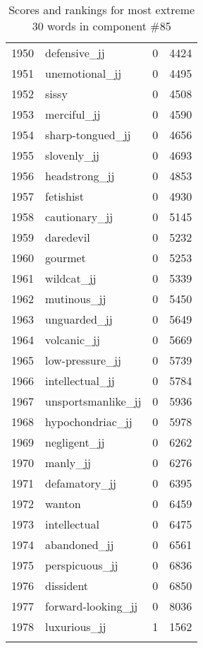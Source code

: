 \begin{longtable}[!htbp]{| rlr@{.}l |}
    1950 & defensive\_jj & 0 & 4424 \\
    1951 & unemotional\_jj & 0 & 4495 \\
    1952 & sissy & 0 & 4508 \\
    1953 & merciful\_jj & 0 & 4590 \\
    1954 & sharp-tongued\_jj & 0 & 4656 \\
    1955 & slovenly\_jj & 0 & 4693 \\
    1956 & headstrong\_jj & 0 & 4853 \\
    1957 & fetishist & 0 & 4930 \\
    1958 & cautionary\_jj & 0 & 5145 \\
    1959 & daredevil & 0 & 5232 \\
    1960 & gourmet & 0 & 5253 \\
    1961 & wildcat\_jj & 0 & 5339 \\
    1962 & mutinous\_jj & 0 & 5450 \\
    1963 & unguarded\_jj & 0 & 5649 \\
    1964 & volcanic\_jj & 0 & 5669 \\
    1965 & low-pressure\_jj & 0 & 5739 \\
    1966 & intellectual\_jj & 0 & 5784 \\
    1967 & unsportsmanlike\_jj & 0 & 5936 \\
    1968 & hypochondriac\_jj & 0 & 5978 \\
    1969 & negligent\_jj & 0 & 6262 \\
    1970 & manly\_jj & 0 & 6276 \\
    1971 & defamatory\_jj & 0 & 6395 \\
    1972 & wanton & 0 & 6459 \\
    1973 & intellectual & 0 & 6475 \\
    1974 & abandoned\_jj & 0 & 6561 \\
    1975 & perspicuous\_jj & 0 & 6836 \\
    1976 & dissident & 0 & 6850 \\
    1977 & forward-looking\_jj & 0 & 8036 \\
    1978 & luxurious\_jj & 1 & 1562 \\
    \hline
    \caption{Scores and rankings for most extreme 30 words in component \#85} \\
\end{longtable}
